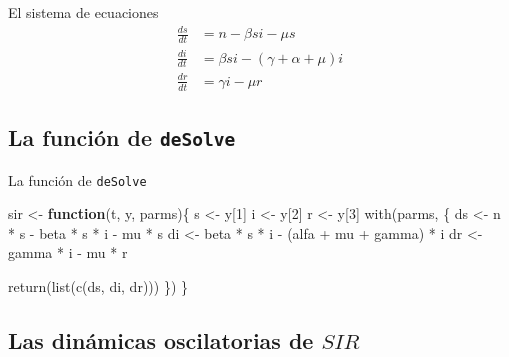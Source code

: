 \documentclass[
  11pt,
  ignorenonframetext,
]{beamer}
\newenvironment{Shaded}{}{}
\newcommand{\ControlFlowTok}[1]{\textcolor[rgb]{0.00,0.44,0.13}{\textbf{#1}}}
\newcommand{\DecValTok}[1]{\textcolor[rgb]{0.25,0.63,0.44}{#1}}
\newcommand{\FunctionTok}[1]{\textcolor[rgb]{0.02,0.16,0.49}{#1}}
\newcommand{\NormalTok}[1]{#1}
\newcommand{\OtherTok}[1]{\textcolor[rgb]{0.00,0.44,0.13}{#1}}
\newcommand{\SpecialCharTok}[1]{\textcolor[rgb]{0.25,0.44,0.63}{#1}}
\begin{document}
\begin{frame}{El sistema de ecuaciones}
\begin{align}
\frac{ds}{dt} & = n  - \beta si - \mu s\\
\frac{di}{dt} & = \beta si - (\gamma + \alpha + \mu) i \\
\frac{dr}{dt} & = \gamma i - \mu r
\end{align}
\end{frame}

\hypertarget{la-funciuxf3n-de-desolve}{%
\subsection{\texorpdfstring{La función de
\texttt{deSolve}}{La función de deSolve}}\label{la-funciuxf3n-de-desolve}}

\begin{frame}[fragile]{La función de \texttt{deSolve}}
\begin{Shaded}
\begin{Highlighting}[]
\NormalTok{sir }\OtherTok{\textless{}{-}} \ControlFlowTok{function}\NormalTok{(t, y, parms)\{}
\NormalTok{  s }\OtherTok{\textless{}{-}}\NormalTok{ y[}\DecValTok{1}\NormalTok{]}
\NormalTok{  i }\OtherTok{\textless{}{-}}\NormalTok{ y[}\DecValTok{2}\NormalTok{]}
\NormalTok{  r }\OtherTok{\textless{}{-}}\NormalTok{ y[}\DecValTok{3}\NormalTok{]}
  \FunctionTok{with}\NormalTok{(parms,}
\NormalTok{       \{}
\NormalTok{         ds }\OtherTok{\textless{}{-}}\NormalTok{ n }\SpecialCharTok{*}\NormalTok{ s }\SpecialCharTok{{-}}\NormalTok{ beta }\SpecialCharTok{*}\NormalTok{ s }\SpecialCharTok{*}\NormalTok{ i }\SpecialCharTok{{-}}\NormalTok{ mu }\SpecialCharTok{*}\NormalTok{ s}
\NormalTok{         di }\OtherTok{\textless{}{-}}\NormalTok{ beta }\SpecialCharTok{*}\NormalTok{ s }\SpecialCharTok{*}\NormalTok{ i }\SpecialCharTok{{-}}\NormalTok{ (alfa }\SpecialCharTok{+}\NormalTok{ mu }\SpecialCharTok{+}\NormalTok{ gamma) }\SpecialCharTok{*}\NormalTok{ i}
\NormalTok{         dr }\OtherTok{\textless{}{-}}\NormalTok{ gamma }\SpecialCharTok{*}\NormalTok{ i  }\SpecialCharTok{{-}}\NormalTok{ mu }\SpecialCharTok{*}\NormalTok{ r}
         
         \FunctionTok{return}\NormalTok{(}\FunctionTok{list}\NormalTok{(}\FunctionTok{c}\NormalTok{(ds, di, dr)))}
\NormalTok{       \})}
\NormalTok{\}}
\end{Highlighting}
\end{Shaded}
\end{frame}

\hypertarget{las-dinuxe1micas-oscilatorias-de-sir}{%
\subsection{\texorpdfstring{Las dinámicas oscilatorias de
\(SIR\)}{Las dinámicas oscilatorias de SIR}}\label{las-dinuxe1micas-oscilatorias-de-sir}}
\end{document}
